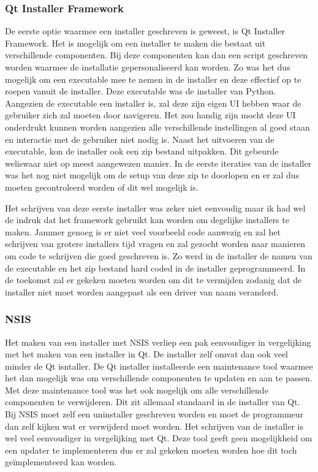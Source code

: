 \documentclass{article}
\begin{document}
\subsubsection{Qt Installer Framework}
De eerste optie waarmee een installer geschreven is geweest, is Qt Installer Framework.
Het is mogelijk om een installer te maken die bestaat uit verschillende componenten.
Bij deze componenten kan dan een script geschreven worden waarmee de installatie gepersonaliseerd kan worden.
Zo was het dus mogelijk om een executable mee te nemen in de installer en deze effectief op te roepen vanuit de installer.
Deze executable was de installer van Python.
Aangezien de executable een installer is, zal deze zijn eigen UI hebben waar de gebruiker zich zal moeten door navigeren. 
Het zou handig zijn mocht deze UI onderdrukt kunnen worden aangezien alle verschillende instellingen al goed staan en interactie met de gebruiker niet nodig is.
Naast het uitvoeren van de executable, kon de installer ook een zip bestand uitpakken.
Dit gebeurde weliswaar niet op meest aangewezen manier.
In de eerste iteraties van de installer was het nog niet mogelijk om de setup van deze zip te doorlopen en er zal dus moeten gecontroleerd worden of dit wel mogelijk is.

Het schrijven van deze eerste installer was zeker niet eenvoudig maar ik had wel de indruk dat het framework gebruikt kan worden om degelijke installers te maken.
Jammer genoeg is er niet veel voorbeeld code aanwezig en zal het schrijven van grotere installers tijd vragen en zal gezocht worden naar manieren om code te schrijven die goed geschreven is.
Zo werd in de installer de namen van de executable en het zip bestand hard coded in de installer geprogrammeerd.
In de toekomst zal er gekeken moeten worden om dit te vermijden zodanig dat de installer niet moet worden aangepast als een driver van naam veranderd.


\subsubsection{NSIS}
Het maken van een installer met NSIS verliep een pak eenvoudiger in vergelijking met het maken van een installer in Qt.
De installer zelf omvat dan ook veel minder de Qt isntaller.
De Qt installer installeerde een maintenance tool waarmee het dan mogelijk was om verschillende componenten te updaten en aan te passen.
Met deze maintenance tool was het ook mogelijk om alle verschillende componenten te verwijderen.
Dit zit allemaal standaard in de installer van Qt.
Bij NSIS moet zelf een uninstaller geschreven worden en moet de programmeur dan zelf kijken wat er verwijderd moet worden.
Het schrijven van de installer is wel veel eenvoudiger in vergelijking met Qt.
Deze tool geeft geen mogelijkheid om een updater te implementeren dus er zal gekeken moeten worden hoe dit toch ge\"implementeerd kan worden.
\end{document}
